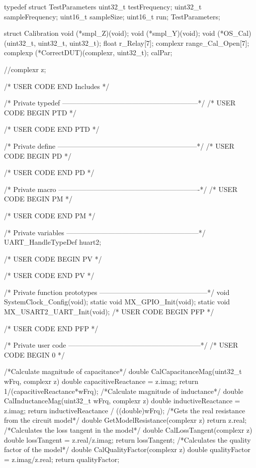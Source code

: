 typedef struct TestParameters{
	uint32_t testFrequency;
	uint32_t sampleFrequency;
	uint16_t sampleSize;
	uint16_t run;
}TestParameters;

struct Calibration{
	void (*smpl_Z)(void);
	void (*smpl_Y)(void);
	void (*OS_Cal)(uint32_t, uint32_t, uint32_t);
	float r_Relay[7];
	complexr range_Cal_Open[7];
	complexp (*CorrectDUT)(complexr, uint32_t);
}calPar;


//complexr z;



/* USER CODE END Includes */

/* Private typedef -----------------------------------------------------------*/
/* USER CODE BEGIN PTD */

/* USER CODE END PTD */

/* Private define ------------------------------------------------------------*/
/* USER CODE BEGIN PD */

/* USER CODE END PD */

/* Private macro -------------------------------------------------------------*/
/* USER CODE BEGIN PM */

/* USER CODE END PM */

/* Private variables ---------------------------------------------------------*/
UART_HandleTypeDef huart2;

/* USER CODE BEGIN PV */

/* USER CODE END PV */

/* Private function prototypes -----------------------------------------------*/
void SystemClock_Config(void);
static void MX_GPIO_Init(void);
static void MX_USART2_UART_Init(void);
/* USER CODE BEGIN PFP */

/* USER CODE END PFP */

/* Private user code ---------------------------------------------------------*/
/* USER CODE BEGIN 0 */

/*Calculate magnitude of capacitance*/
double CalCapacitanceMag(uint32_t wFrq, complexr z){
	double capacitiveReactance = z.imag;
	return 1/(capacitiveReactance*wFrq);
}
/*Calculate magnitude of inductance*/
double CalInductanceMag(uint32_t wFrq, complexr z){
	double inductiveReactance = z.imag;
	return inductiveReactance / ((double)wFrq);
}
/*Gets the real resistance from the circuit model*/
double GetModelResistance(complexr z){
	return z.real;
}
/*Calculates the loss tangent in the model*/
double CalLossTangent(complexr z){
	double lossTangent = z.real/z.imag;
	return lossTangent;
}
/*Calculates the quality factor of the model*/
double CalQualityFactor(complexr z){
	double qualityFactor = z.imag/z.real;
	return qualityFactor;
}

